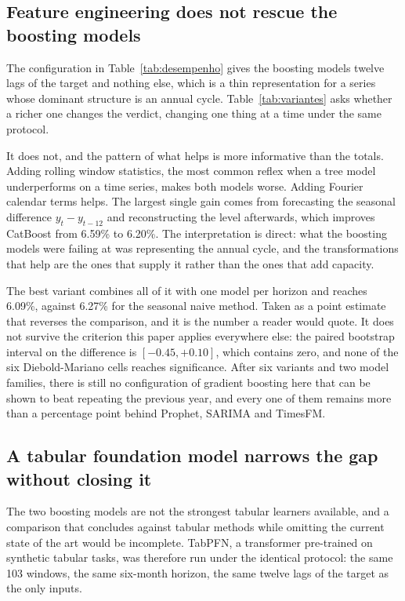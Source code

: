 \subsection{Feature engineering does not rescue the boosting models}



The configuration in Table~\ref{tab:desempenho} gives the boosting models twelve lags of the
target and nothing else, which is a thin representation for a series whose dominant structure
is an annual cycle. Table~\ref{tab:variantes} asks whether a richer one changes the verdict,
changing one thing at a time under the same protocol.

It does not, and the pattern of what helps is more informative than the totals. Adding
rolling window statistics, the most common reflex when a tree model underperforms on a time
series, makes both models worse. Adding Fourier calendar terms helps. The largest single
gain comes from forecasting the seasonal difference $y_t - y_{t-12}$ and reconstructing the
level afterwards, which improves CatBoost from 6.59\% to 6.20\%. The interpretation is
direct: what the boosting models were failing at was representing the annual cycle, and the
transformations that help are the ones that supply it rather than the ones that add capacity.

The best variant combines all of it with one model per horizon and reaches 6.09\%,
against 6.27\% for the seasonal naive method. Taken as a point estimate that reverses the
comparison, and it is the number a reader would quote. It does not survive the criterion
this paper applies everywhere else: the paired bootstrap interval on the difference is
$[-0.45, +0.10]$, which contains zero, and none of the six Diebold-Mariano
cells reaches significance. After six variants and two model families, there is still no
configuration of gradient boosting here that can be shown to beat repeating the previous
year, and every one of them remains more than a percentage point behind Prophet, SARIMA and
TimesFM.

\subsection{A tabular foundation model narrows the gap without closing it}

The two boosting models are not the strongest tabular learners available, and a comparison
that concludes against tabular methods while omitting the current state of the art would be
incomplete. TabPFN, a transformer pre-trained on synthetic tabular tasks, was therefore run
under the identical protocol: the same 103 windows, the same six-month horizon, the same
twelve lags of the target as the only inputs.

